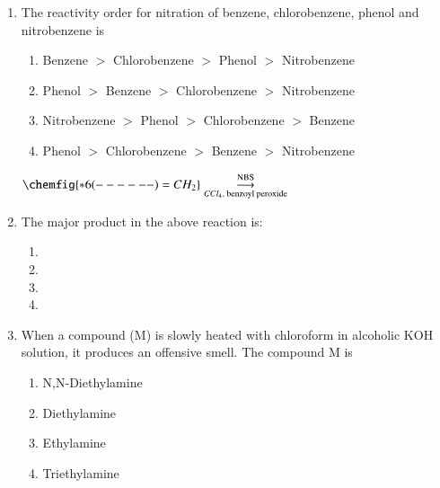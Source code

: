 \documentclass[journal,12pt,onecolumn]{IEEEtran}
\begin{document}
\begin{enumerate}
    \item The reactivity order for nitration of benzene, chlorobenzene, phenol and nitrobenzene is  
    \begin{multicols}{2}
    \begin{enumerate}[label=(\Alph*)]
        \item Benzene $>$ Chlorobenzene $>$ Phenol $>$ Nitrobenzene
        \item Phenol $>$ Benzene $>$ Chlorobenzene $>$ Nitrobenzene
        \item Nitrobenzene $>$ Phenol $>$ Chlorobenzene $>$ Benzene
        \item Phenol $>$ Chlorobenzene $>$ Benzene $>$ Nitrobenzene
    \end{enumerate}
    \end{multicols}

\({\chemfig{*6(------)=CH_2}} 
\underset{\text{$CCl_{4}$, benzoyl peroxide}}{\overset{\text{NBS}}{\longrightarrow}} 
\)
 \item The major product in the above reaction is:
  \begin{enumerate}[label=(\Alph*)]
   
    \item{}
    \item{}
    \item{}
    \item{}
 \end{enumerate}

    \item When a compound (M) is slowly heated with chloroform in alcoholic KOH solution, it produces an offensive smell. The compound M is  
    \begin{multicols}{4}
    \begin{enumerate}[label=(\Alph*)]
        \item N,N-Diethylamine
        \item Diethylamine
        \item Ethylamine
        \item Triethylamine
    \end{enumerate}
    \end{multicols}


\end{enumerate}
\end{document}
